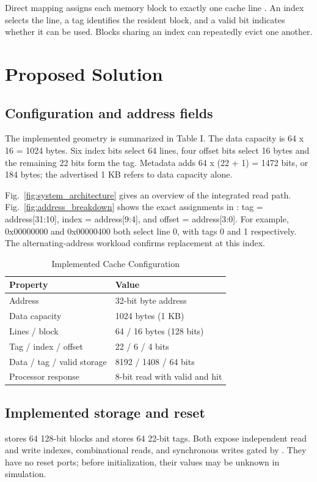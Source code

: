 \documentclass[conference]{IEEEtran}
\begin{document}
Direct mapping assigns each memory block to exactly one cache line \cite{smith1982,patterson2020}. An index selects the line, a tag identifies the resident block, and a valid bit indicates whether it can be used. Blocks sharing an index can repeatedly evict one another.

\section{Proposed Solution}
\subsection{Configuration and address fields}
The implemented geometry is summarized in Table I. The data capacity is 64 x 16 = 1024 bytes. Six index bits select 64 lines, four offset bits select 16 bytes and the remaining 22 bits form the tag. Metadata adds 64 x (22 + 1) = 1472 bits, or 184 bytes; the advertised 1 KB refers to data capacity alone.

Fig.~\ref{fig:system_architecture} gives an overview of the integrated read path. Fig.~\ref{fig:address_breakdown} shows the exact assignments in : tag = address[31:10], index = address[9:4], and offset = address[3:0]. For example, 0x00000000 and 0x00000400 both select line 0, with tags 0 and 1 respectively. The alternating-address workload confirms replacement at this index.

\begin{table}[ht]
\caption{Implemented Cache Configuration}
\centering\small
\begin{tabular}{p{}p{}}
\toprule
Property & Value\\\midrule
Address & 32-bit byte address\\
Data capacity & 1024 bytes (1 KB)\\
Lines / block & 64 / 16 bytes (128 bits)\\
Tag / index / offset & 22 / 6 / 4 bits\\
Data / tag / valid storage & 8192 / 1408 / 64 bits\\
Processor response & 8-bit read with valid and hit\\
\bottomrule\end{tabular}
\end{table}
\subsection{Implemented storage and reset}
 stores 64 128-bit blocks and  stores 64 22-bit tags. Both expose independent read and write indexes, combinational reads, and synchronous writes gated by . They have no reset ports; before initialization, their values may be unknown in simulation.
\end{document}
